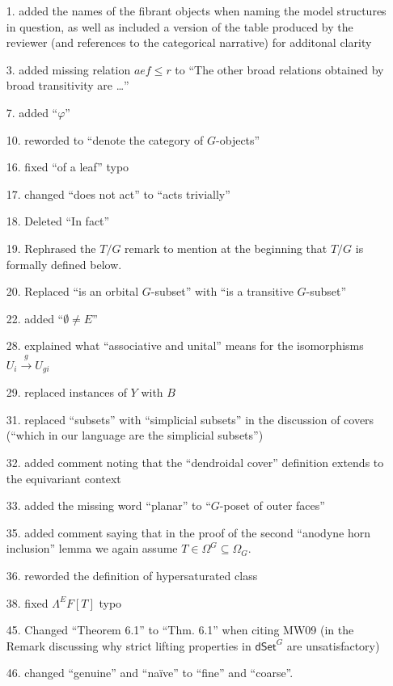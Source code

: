 \documentclass{article}
\begin{document}
\begin{itemize}
\item[1.] added the names of the fibrant objects when naming the model structures in question, as well as included a version of the table produced by the reviewer (and references to the categorical narrative) for additonal clarity

\item[3.] added missing relation $aef \leq r$ to ``The other broad relations obtained by broad transitivity are \dots''
\item[7.] added ``$\varphi$''
\item[10.] reworded to ``denote the category of $G$-objects''
\item[16.] fixed ``of a leaf'' typo
\item[17.] changed ``does not act'' to ``acts trivially''
\item[18.] Deleted ``In fact''
\item[19.] Rephrased the $T/G$ remark to mention at the beginning that $T/G$ is formally defined below.
\item[20.] Replaced ``is an orbital $G$-subset'' with ``is a transitive $G$-subset''
\item[22.] added ``$\emptyset \neq E$''
\item[28.] explained what ``associative and unital'' means for the isomorphisms $U_i \xrightarrow{g} U_{gi}$
\item[29.] replaced instances of $Y$ with $B$
\item[31.] replaced ``subsets'' with ``simplicial subsets'' in the discussion of covers (``which in our language are the simplicial subsets'')
\item[32.] added comment noting that the ``dendroidal cover'' definition extends to the equivariant context
\item[33.] added the missing word ``planar'' to ``$G$-poset of outer faces''
\item[35.] added comment saying that in the proof of the second ``anodyne horn inclusion'' lemma we again assume $T \in \Omega^G \subseteq \Omega_G$.
\item[36.] reworded the definition of hypersaturated class
\item[38.] fixed $\Lambda^EF[T]$ typo
\item[45.] Changed ``Theorem 6.1'' to ``Thm. 6.1'' when citing MW09 (in the Remark discussing why strict lifting properties in $\mathsf{dSet}^G$ are unsatisfactory)
\item[46.] changed ``genuine'' and ``na\"ive'' to ``fine'' and ``coarse''.

\end{itemize}
\end{document}
